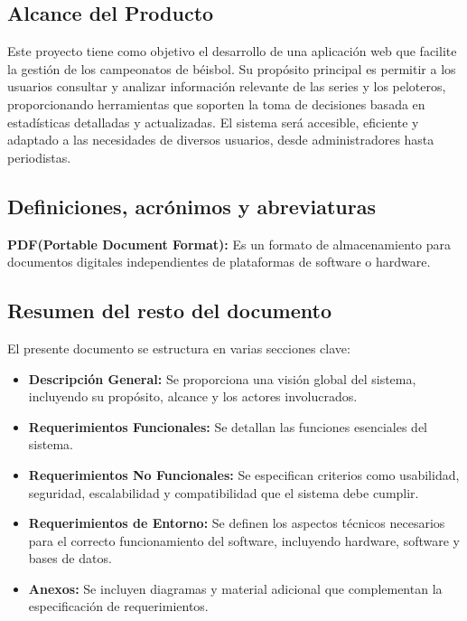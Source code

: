 \documentclass{report}
\begin{document}
        \subsection*{Alcance del Producto}

        Este proyecto tiene como objetivo el desarrollo de una aplicación web que facilite la gestión de los 
        campeonatos de béisbol. Su propósito principal es permitir a los usuarios consultar y analizar información 
        relevante de las series y los peloteros, proporcionando herramientas que soporten la toma de decisiones 
        basada en estadísticas detalladas y actualizadas. El sistema será accesible, eficiente y adaptado a las 
        necesidades de diversos usuarios, desde administradores hasta periodistas.


        \subsection*{Definiciones, acrónimos y abreviaturas}
        \textbf{PDF(Portable Document Format):} Es un formato de almacenamiento para documentos 
        digitales independientes de plataformas de software o hardware.

        \subsection*{Resumen del resto del documento}
        El presente documento se estructura en varias secciones clave:

        \begin{itemize}
            \item \textbf{Descripción General:} Se proporciona una visión global del sistema, incluyendo su propósito, alcance y los actores involucrados.
            \item \textbf{Requerimientos Funcionales:} Se detallan las funciones esenciales del sistema.
            \item \textbf{Requerimientos No Funcionales:} Se especifican criterios como usabilidad, seguridad, escalabilidad y compatibilidad que el sistema debe cumplir.
            \item \textbf{Requerimientos de Entorno:} Se definen los aspectos técnicos necesarios para el correcto funcionamiento del software, incluyendo hardware, software y bases de datos.
            \item \textbf{Anexos:} Se incluyen diagramas y material adicional que complementan la especificación de requerimientos.
        \end{itemize}
\end{document}
